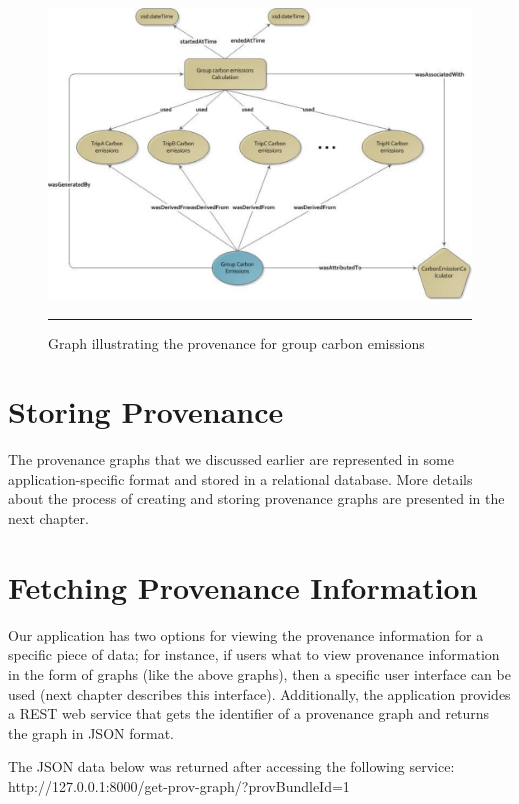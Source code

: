 \begin{figure}[htbp]
	\centering
		\includegraphics[scale=0.60]{./Figures/chapter3/figure6.pdf}
		\rule{35em}{0.5pt}
	\caption[Graph illustrating the provenance for group carbon emissions]{Graph illustrating the provenance for group carbon emissions}
	\label{fig:provGroupCo2Graph}
\end{figure}

\section{Storing Provenance}

The provenance graphs that we discussed earlier are represented in some application-specific format and stored in a relational database. More details about the process of creating and storing provenance graphs are presented in the next chapter.

\section{Fetching Provenance Information}

Our application has two options for viewing the provenance information for a specific piece of data; for instance, if users what to view provenance information in the form of graphs (like the above graphs), then a specific user interface can be used (next chapter describes this interface). Additionally, the application provides a REST web service that gets the identifier of a provenance graph and returns the graph in JSON format.

The JSON data below was returned after accessing the following service: http://127.0.0.1:8000/get-prov-graph/?provBundleId=1


